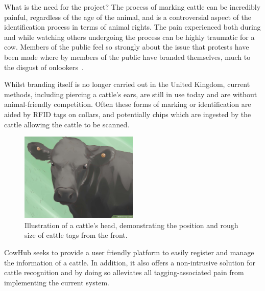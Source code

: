 
\begin{subsection}{What is the need for the project?}
  The process of marking cattle can be incredibly painful, regardless of the age of the animal, and is a controversial aspect of the identification process in terms of animal rights. The pain experienced both during and while watching others undergoing the process can be highly traumatic for a cow. Members of the public feel so strongly about the issue that protests have been made where by members of the public have branded themselves, much to the disgust of onlookers~\cite{theguardian1}.

  Whilst branding itself is no longer carried out in the United Kingdom, current methods, including piercing a cattle's ears, are still in use today and are without animal-friendly competition. Often these forms of marking or identification are aided by RFID tags on collars, and potentially chips which are ingested by the cattle allowing the cattle to be scanned.

  \begin{figure}[H]
  	\centering
    \includegraphics[width=0.5\textwidth]{images/cattle-with-ear-tag.jpg}
  	\caption[Cattle ear tagging]{
      Illustration of a cattle's head, demonstrating the position and rough size of cattle tags from the front. \cite{wikihow1}
  	}
  \end{figure}

  CowHub seeks to provide a user friendly platform to easily register and manage the information of a cattle. In addition, it also offers a non-intrusive solution for cattle recognition and by doing so alleviates all tagging-associated pain from implementing the current system.

\end{subsection}
